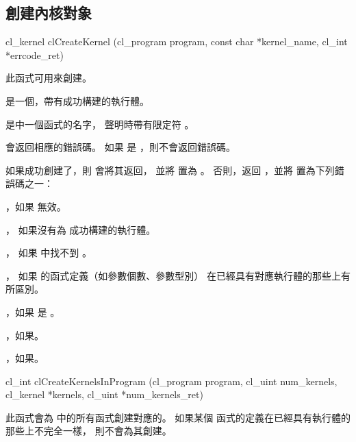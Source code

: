 \subsection{創建內核對象}


\startCLFUNC
cl_kernel clCreateKernel (cl_program program,
			const char *kernel_name,
			cl_int *errcode_ret)
\stopCLFUNC

此函式可用來創建。

 是一個，帶有成功構建的執行體。

 是中一個函式的名字，
聲明時帶有限定符 。

 會返回相應的錯誤碼。
如果  是 ，則不會返回錯誤碼。

如果成功創建了，則  會將其返回，
並將  置為 。
否則，返回 ，並將  置為下列錯誤碼之一：
\startigBase
\item {}，如果  無效。

\item {}，
如果沒有為  成功構建的執行體。

\item {}，
如果  中找不到 。

\item {}，
如果  的函式定義（如參數個數、參數型別）
在已經具有對應執行體的那些上有所區別。

\item {}，如果  是 。

\item {}，如果\scdevfailres。

\item {}，如果\schostfailres。
\stopigBase


\startCLFUNC
cl_int clCreateKernelsInProgram (cl_program program,
			cl_uint num_kernels,
			cl_kernel *kernels,
			cl_uint *num_kernels_ret)
\stopCLFUNC

此函式會為  中的所有函式創建對應的。
如果某個  函式的定義在已經具有執行體的那些上不完全一樣，
則不會為其創建。

